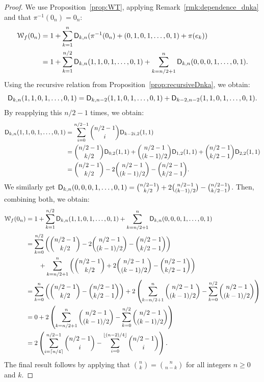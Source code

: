 \documentclass{llncs}
\begin{document}
\begin{proof}
	We use Proposition~\ref{prop:WT}, applying Remark~\ref{rmk:dependence_dnka} and that $\pi^{-1}(0_n)=0_n$:
	\begin{align*}
		\wt{f}(0_n)&=1+\sum_{k=1}^n\Dnka{n}{k}{\pi^{-1}(0_n)+(0,1,0,1,\ldots,0,1)+\pi(e_k)}\\
		&=1+\sum_{k=1}^{n/2}\Dnka{n}{k}{1,1,0,1,\ldots,0,1}+\sum_{k=n/2+1}^{n}\Dnka{n}{k}{0,0,0,1,\ldots,0,1}.
	\end{align*}
	Using the recursive relation from Proposition~\ref{prop:recursiveDnka}, we obtain:
	\[
		\Dnka{n}{k}{1,1,0,1,\ldots,0,1}=\Dnka{n-2}{k}{1,1,0,1,\ldots,0,1} +\Dnka{n-2}{k-2}{1,1,0,1,\ldots,0,1}.
	\]
	By reapplying this $n/2-1$ times, we obtain:
	\begin{align*}
		\Dnka{n}{k}{1,1,0,1,\ldots,0,1}&=\sum_{i=0}^{n/2-1} \binom{n/2-1}{i} \Dnka{2}{k-2i}{1,1}\\
		&=\binom{n/2-1}{k/2} \Dnka{2}{0}{1,1}+ \binom{n/2-1}{(k-1)/2} \Dnka{2}{1}{1,1}+ \binom{n/2-1}{k/2-1} \Dnka{2}{2}{1,1}\\
		&=\binom{n/2-1}{k/2}-2\binom{n/2-1}{(k-1)/2}-\binom{n/2-1}{k/2-1}.
	\end{align*}
	We similarly get $\Dnka{n}{k}{0,0,0,1,\ldots,0,1}=\binom{n/2-1}{k/2} +2 \binom{n/2-1}{(k-1)/2}-\binom{n/2-1}{k/2-1}$. Then, combining both, we obtain:
	\begin{align*}
		\wt{f}(0_n)&=1+\sum_{k=1}^{n/2}\Dnka{n}{k}{1,1,0,1,\ldots,0,1}+ \sum_{k=n/2+1}^{n}\Dnka{n}{k}{0,0,0,1,\ldots,0,1}\\
		&=\sum_{k=0}^{n/2} \left(\binom{n/2-1}{k/2} -2 \binom{n/2-1}{(k-1)/2}-\binom{n/2-1}{k/2-1}\right)\\
		&\qquad+\sum_{k=n/2+1}^{n}\left(\binom{n/2-1}{k/2}+2\binom{n/2-1}{(k-1)/2}-\binom{n/2-1}{k/2-1}\right)\\
		&=\sum_{k=0}^{n}\left( \binom{n/2-1}{k/2}-\binom{n/2-1}{k/2-1}\right)+2\left(\sum_{k=n/2+1}^{n}\binom{n/2-1}{(k-1)/2}-\sum_{k=0}^{n/2}\binom{n/2-1}{(k-1)/2}\right)\\
		&=0+2\left(\sum_{k=n/2+1}^{n}\binom{n/2-1}{(k-1)/2}-\sum_{k=0}^{n/2} \binom{n/2-1}{(k-1)/2}\right)\\
		&=2\left(\sum_{i=\lceil n/4\rceil}^{n/2-1} \binom {n/2-1}{i} - \sum_{i=0}^{\lfloor(n-2)/4\rfloor} \binom{n/2-1}{i}\right).
	\end{align*}
	The final result follows by applying that $\binom{n}{k}=\binom{n}{n-k}$ for all integers $n\geq 0$ and $k$.
\end{proof}
\end{document}
